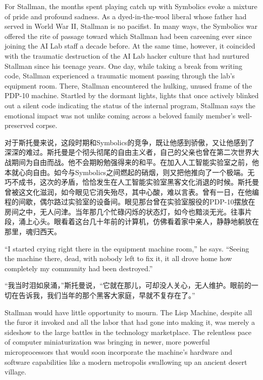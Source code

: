 \ifdefined\eng
For Stallman, the months spent playing catch up with Symbolics evoke a mixture of pride and profound sadness. As a dyed-in-the-wool liberal whose father had served in World War II, Stallman is no pacifist. In many ways, the Symbolics war offered the rite of passage toward which Stallman had been careening ever since joining the AI Lab staff a decade before. At the same time, however, it coincided with the traumatic destruction of the AI Lab hacker culture that had nurtured Stallman since his teenage years. One day, while taking a break from writing code, Stallman experienced a traumatic moment passing through the lab's equipment room. There, Stallman encountered the hulking, unused frame of the PDP-10 machine. Startled by the dormant lights, lights that once actively blinked out a silent code indicating the status of the internal program, Stallman says the emotional impact was not unlike coming across a beloved family member's well-preserved corpse.
\fi

\ifdefined\chs
对于斯托曼来说，这段时期和Symbolics的竞争，既让他感到骄傲，又让他感到了深深的难过。斯托曼是个彻头彻尾的自由主义者，自己的父亲也曾在第二次世界大战期间为自由而战。他不会期盼勉强得来的和平。在加入人工智能实验室之前，他本就心向自由。如今与Symbolics之间燃起的硝烟，则又把他推向了一个极端。无巧不成书，这次的矛盾，恰恰发生在人工智能实验室黑客文化消退的时候。斯托曼曾被这文化滋润，如今眼见它消失殆尽，其中心酸，难以言表。曾有一日，在他编程的间歇，偶尔路过实验室的设备间。眼见那台曾在实验室服役的PDP-10摆放在房间之中，无人问津。当年那几个忙碌闪烁的状态灯，如今也黯淡无光。往事片段，涌上心头。眼看着这台几十年前的计算机，仿佛看着家中亲人，静静地躺放在那里，魂归西天。
\fi

\ifdefined\eng
``I started crying right there in the \ifdefined\vone equipment \fi\ifdefined\vtwo machine \fi room,'' he says. ``Seeing the machine there, dead, with nobody left to fix it, it all drove home how completely my community had been destroyed.''
\fi

\ifdefined\chs
``我当时泪如泉涌，''斯托曼说，``它就在那儿，可却没人关心，无人维护。眼前的一切在告诉我，我们当年的那个黑客大家庭，早就不复存在了。''
\fi

\ifdefined\eng
Stallman would have little opportunity to mourn. The Lisp Machine, despite all the furor it invoked and all the labor that had gone into making it, was merely a sideshow to the large battles in the technology marketplace. The relentless pace of computer miniaturization was bringing in newer, more powerful microprocessors that would soon incorporate the machine's hardware and software capabilities like a modern metropolis swallowing up an ancient desert village.
\fi

